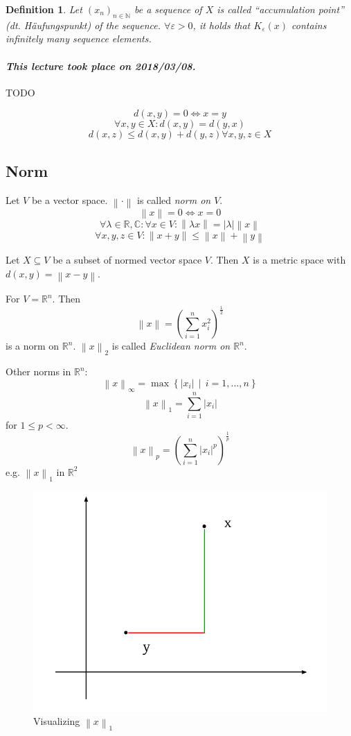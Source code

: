 \documentclass{article}
\newtheorem{definition}{Definition}  \numberwithin{definition}{section}
\newcommand{\setdef}[2]{\left\{\left.#1\,\middle|\,#2\right.\right\}}
\newcommand{\norm}[1]{\left\|#1\right\|}
\newcommand{\card}[1]{\left|#1\right|}
\newcommand{\dateref}[1]{\paragraph{\textit{This lecture took place on #1.}}}
\begin{document}
\begin{definition}
  Let $(x_n)_{n\in\mathbb N}$ be a sequence of $X$ is called \enquote{accumulation point} (\foreignlanguage{german}{dt. H\"aufungspunkt}) of the sequence.
  $\forall \varepsilon > 0$, it holds that $K_{\varepsilon}(x)$ contains infinitely many sequence elements.
\end{definition}

\dateref{2018/03/08}

TODO

\[ d(x,y) =0 \iff x = y \]
\[ \forall x,y \in X: d(x,y) = d(y,x) \]
\[ d(x,z) \leq d(x,y) + d(y,z) \forall x,y,z \in X \]

\subsection{Norm}

Let $V$ be a vector space. $\norm{\cdot}$ is called \emph{norm on $V$}.
\[ \norm{x} = 0 \iff x = 0 \]
\[ \forall \lambda \in \mathbb R, \mathbb C: \forall x \in V: \norm{\lambda x} = \card{\lambda} \norm{x} \]
\[ \forall x,y,z \in V: \norm{x + y} \leq \norm{x} + \norm{y} \]

Let $X \subseteq V$ be a subset of normed vector space $V$.
Then $X$ is a metric space with $d(x,y) = \norm{x - y}$.

For $V = \mathbb R^n$. Then
\[ \norm{x} = \left(\sum_{i=1}^n x_i^2\right)^{\frac12} \]
is a norm on $\mathbb R^n$. $\norm{x}_2$ is called \emph{Euclidean norm on $\mathbb R^n$}.

Other norms in $\mathbb R^n$:
\[ \norm{x}_{\infty} = \max\setdef{\card{x_i}}{i = 1,\dots,n} \]
\[ \norm{x}_1 = \sum_{i=1}^n \card{x_i} \]
for $1 \leq p < \infty$.
\[ \norm{x}_p = \left(\sum_{i=1}^n \card{x_i}^p\right)^{\frac1p} \]
e.g. $\norm{x}_1$ in $\mathbb R^2$

\begin{figure}[!ht]
  \begin{center}
    \includegraphics{img/02_1norm.pdf}
    \caption{Visualizing $\norm{x}_1$}
    \label{img:1norm}
  \end{center}
\end{figure}
\end{document}
